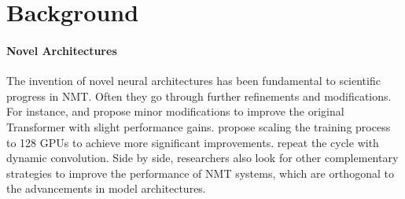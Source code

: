 \documentclass{article}
\begin{document}
\begin{comment}
Data Augmentation for Low-Resource Neural Machine Translation
https://www.aclweb.org/anthology/P17-2090/

SwitchOut: an Efficient Data Augmentation Algorithm for Neural Machine Translation
https://www.aclweb.org/anthology/D18-1100/

Soft Contextual Data Augmentation for Neural Machine Translation
https://arxiv.org/pdf/1905.10523.pdf

Improving Neural Machine Translation Robustness via Data Augmentation: Beyond Back Translation
https://arxiv.org/pdf/1910.03009.pdf

UNSUPERVISED DATA AUGMENTATION
FOR CONSISTENCY TRAINING
https://arxiv.org/pdf/1904.12848.pdf

QANet augmentation


Improving Neural Machine Translation Models with Monolingual Data
https://arxiv.org/pdf/1511.06709.pdf

On The Evaluation of Machine Translation Systems
Trained With Back-Translation
https://arxiv.org/pdf/1908.05204.pdf


https://blog.statsbot.co/ensemble-learning-d1dcd548e936
\end{comment}




















 
\section{Background}\label{sec:background}
\paragraph{Novel Architectures}


The invention of novel neural architectures has been fundamental to scientific progress in NMT. Often they go through further refinements and modifications. For instance, \citet{self_relative} and \citet{weighted_transformer} propose minor modifications to improve the original Transformer  \citep{vaswani2017attention} with slight performance gains. \citet{scaling_nmt_ott2018scaling} propose scaling the training process to 128 GPUs to achieve more significant improvements. \citet{payless_wu2018} repeat the cycle with dynamic convolution.
Side by side, researchers also look for other complementary strategies to improve the performance of NMT systems, which are orthogonal to the advancements in model architectures.
\end{document}
